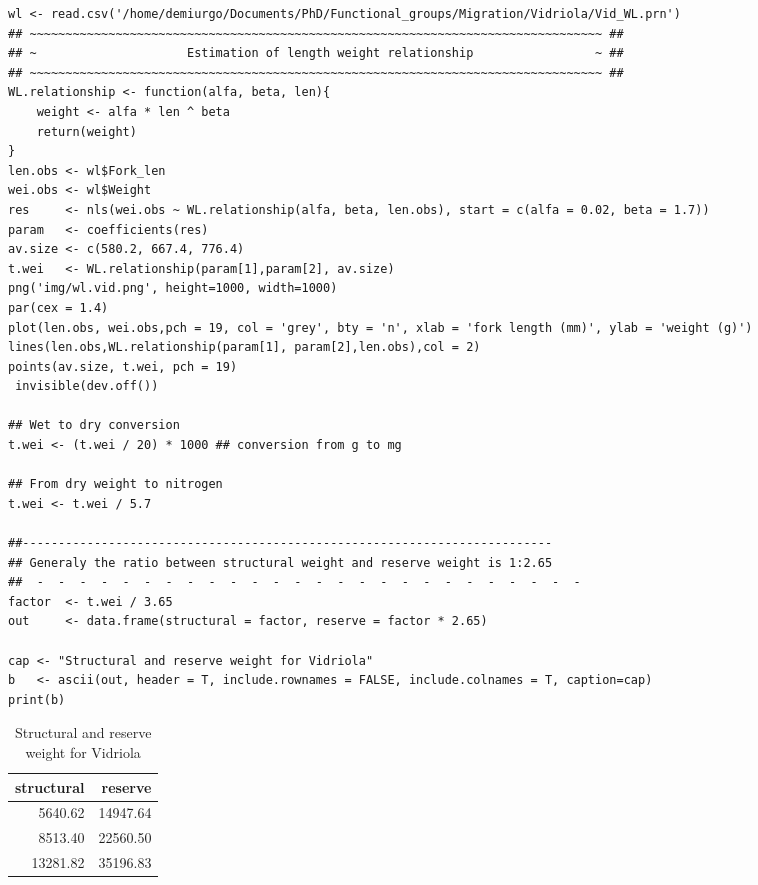 \documentclass[11pt]{article}
\begin{document}
\begin{itemize}
\begin{itemize}
\begin{verbatim}
wl <- read.csv('/home/demiurgo/Documents/PhD/Functional_groups/Migration/Vidriola/Vid_WL.prn')
## ~~~~~~~~~~~~~~~~~~~~~~~~~~~~~~~~~~~~~~~~~~~~~~~~~~~~~~~~~~~~~~~~~~~~~~~~~~~~~~~~ ##
## ~                     Estimation of length weight relationship                 ~ ##
## ~~~~~~~~~~~~~~~~~~~~~~~~~~~~~~~~~~~~~~~~~~~~~~~~~~~~~~~~~~~~~~~~~~~~~~~~~~~~~~~~ ##
WL.relationship <- function(alfa, beta, len){
    weight <- alfa * len ^ beta
    return(weight)
}
len.obs <- wl$Fork_len
wei.obs <- wl$Weight
res     <- nls(wei.obs ~ WL.relationship(alfa, beta, len.obs), start = c(alfa = 0.02, beta = 1.7))
param   <- coefficients(res)
av.size <- c(580.2, 667.4, 776.4)
t.wei   <- WL.relationship(param[1],param[2], av.size)
png('img/wl.vid.png', height=1000, width=1000)
par(cex = 1.4)
plot(len.obs, wei.obs,pch = 19, col = 'grey', bty = 'n', xlab = 'fork length (mm)', ylab = 'weight (g)')
lines(len.obs,WL.relationship(param[1], param[2],len.obs),col = 2)
points(av.size, t.wei, pch = 19)
 invisible(dev.off())

## Wet to dry conversion
t.wei <- (t.wei / 20) * 1000 ## conversion from g to mg

## From dry weight to nitrogen
t.wei <- t.wei / 5.7

##--------------------------------------------------------------------------
## Generaly the ratio between structural weight and reserve weight is 1:2.65
##  -  -  -  -  -  -  -  -  -  -  -  -  -  -  -  -  -  -  -  -  -  -  -  -  -  -
factor  <- t.wei / 3.65
out     <- data.frame(structural = factor, reserve = factor * 2.65)

cap <- "Structural and reserve weight for Vidriola"
b   <- ascii(out, header = T, include.rownames = FALSE, include.colnames = T, caption=cap)
print(b)
\end{verbatim}
\end{itemize}
\begin{table}[htb]
\caption{Structural and reserve weight for Vidriola}
\begin{center}
\begin{tabular}{rr}
 structural  &   reserve  \\
\hline
    5640.62  &  14947.64  \\
    8513.40  &  22560.50  \\
   13281.82  &  35196.83  \\
\end{tabular}
\end{center}
\end{table}


\end{itemize}
\end{document}
